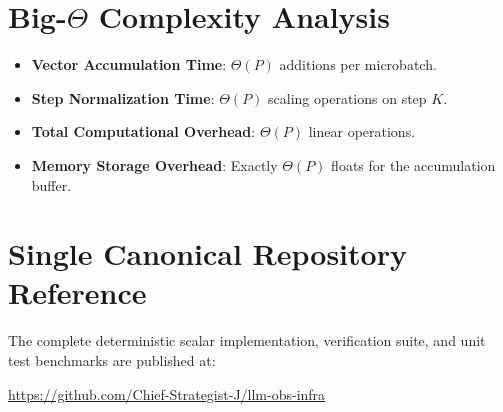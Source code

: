 \documentclass[11pt,a4paper]{article}
\theoremstyle{definition}
\begin{document}
\section{Big-$\Theta$ Complexity Analysis}

\begin{itemize}
    \item \textbf{Vector Accumulation Time}: $\Theta(P)$ additions per microbatch.
    \item \textbf{Step Normalization Time}: $\Theta(P)$ scaling operations on step $K$.
    \item \textbf{Total Computational Overhead}: $\Theta(P)$ linear operations.
    \item \textbf{Memory Storage Overhead}: Exactly $\Theta(P)$ floats for the accumulation buffer.
\end{itemize}

\section{Single Canonical Repository Reference}

The complete deterministic scalar implementation, verification suite, and unit test benchmarks are published at:
\begin{center}
\url{https://github.com/Chief-Strategist-J/llm-obs-infra}
\end{center}
\end{document}
